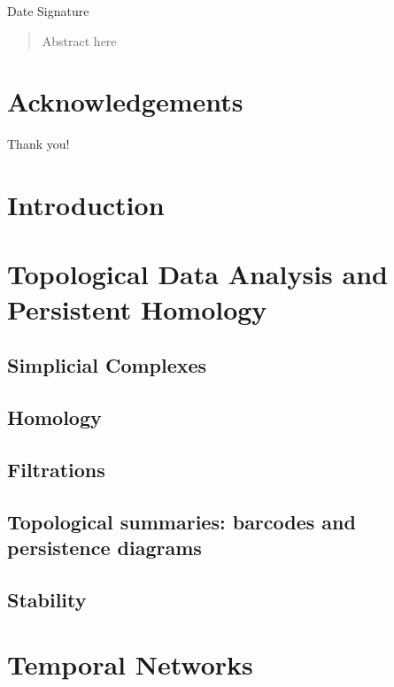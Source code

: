 \documentclass[a4paper,11pt,openany,extrafontsizes]{memoir}
\begin{document}
\begin{center}
  Date \hspace{.5\linewidth} Signature
\end{center}


\cleardoublepage%

\begin{abstract}
  Abstract here
\end{abstract}

\cleardoublepage%

\chapter*{Acknowledgements}%
\label{cha:acknowledgements}

Thank you!

\cleardoublepage%

\tableofcontents*
\listoffigures*
\listoftables*

\clearpage

\mainmatter%

\chapter{Introduction}%
\label{cha:introduction}



\chapter{Topological Data Analysis and Persistent Homology}%
\label{cha:tda-ph}

\section{Simplicial Complexes}%
\label{sec:simplicial-complexes}

\section{Homology}%
\label{sec:homology}

\section{Filtrations}%
\label{sec:filtrations}

\section{Topological summaries: barcodes and persistence diagrams}%
\label{sec:topol-summ}

\section{Stability}%
\label{sec:stability}



\chapter{Temporal Networks}%
\label{cha:temporal-networks}




\backmatter%

\nocite{*}

%
\label{cha:bibliography}
\end{document}
